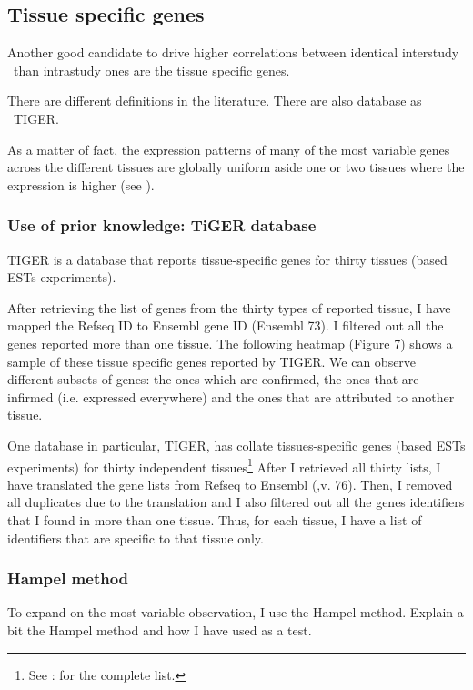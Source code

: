 \subsection{Tissue specific genes}\label{sub:TisSpeGene}

Another good candidate to drive higher correlations
between identical interstudy \treps\ than intrastudy ones are
the tissue specific genes.

There are different definitions in the literature.
There are also database as \eg\ \gls{TIGER}.

As a matter of fact, the expression patterns of many of
the most variable genes across the different tissues
are globally uniform aside one or two tissues
where the expression is higher (see ).

\subsubsection{Use of prior knowledge: TiGER database}\label{subsub:Tiger}

\gls{TIGER} is a database that reports tissue-specific genes for thirty tissues
(based \glspl{EST} experiments).

After retrieving the list of genes from the thirty types of reported tissue, I have mapped the Refseq ID to Ensembl gene ID (Ensembl 73).
I filtered out all the genes reported more than one tissue. The following heatmap (Figure 7) shows a sample of these tissue specific genes reported by TIGER. We can observe different subsets of genes: the ones which are confirmed, the ones that are infirmed (i.e. expressed everywhere) and the ones that are attributed to another tissue.


One database in particular, \gls{TIGER},
has collate tissues-specific genes (based \glspl{EST} experiments)
for thirty independent tissues\footnote{See : 
for the complete list.}
After I retrieved all thirty lists,
I have translated the gene lists from \gls{Refseq} to \gls{Ensembl} (,v. 76).
Then, I removed all duplicates due to the translation and I also filtered out
all the genes identifiers that I found in more than one tissue.
Thus, for each tissue,
I have a list of identifiers that are specific to that tissue only.


\subsubsection{Hampel method}\label{subsub:Hampel}
To expand on the most variable observation, I use the Hampel method.
Explain a bit the Hampel method and how I have used as a test.

